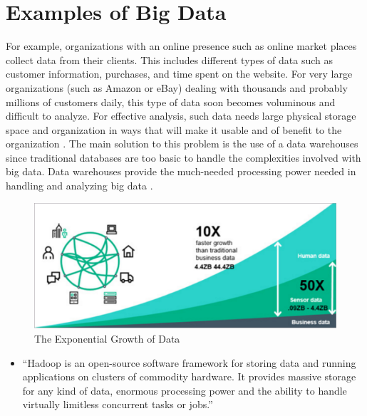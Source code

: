 \documentclass[sigconf]{acmart}
\begin{document}
\section{Examples of Big Data}
For example, organizations with an online presence such as online market places collect data from their clients. This includes different types of data such as customer information, purchases, and time spent on the website. For very large organizations (such as Amazon or eBay) dealing with thousands and probably millions of customers daily, this type of data soon becomes voluminous and difficult to analyze. For effective analysis, such data needs large physical storage space and organization in ways that will make it usable and of benefit to the organization \cite{Arora2016}. The main solution to this problem is the use of a data warehouses since traditional databases are too basic to handle the complexities involved with big data. Data warehouses provide the much-needed processing power needed in handling and analyzing big data \cite{Arora2016}.
\begin{figure}[!ht]
  \centering\includegraphics[width=\columnwidth]{images/data-growth-rate.png}
  \caption{The Exponential Growth of Data \cite{part-reg}}
  \label{Figure 1}
\end{figure}
\begin{itemize}

  \item ``Hadoop is an open-source software framework for storing data and running applications on clusters of commodity hardware. It provides massive storage for any kind of data, enormous processing power and the ability to handle virtually limitless concurrent tasks or jobs\cite{sas1}.''
\end{itemize}
\end{document}
